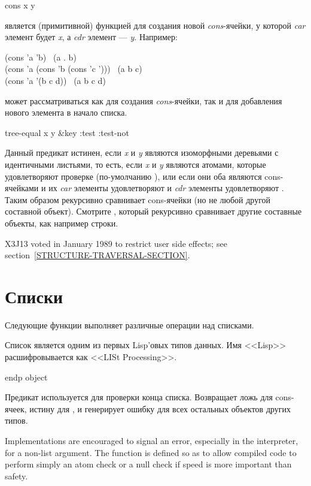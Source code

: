 \begin{defun}[Функция]
cons x y

 является (примитивной) функцией для создания новой
\emph{cons}-ячейки, у которой \emph{car} элемент будет \emph{x}, а \emph{cdr}
элемент --- \emph{y}.
Например:
\begin{lisp}
(cons 'a 'b) \EV\ (a . b) \\
(cons 'a (cons 'b (cons 'c '{\emptylist}))) \EV\ (a b c) \\
(cons 'a '(b c d)) \EV\ (a b c d)
\end{lisp}
 может рассматриваться как для создания \emph{cons}-ячейки, так и для
добавления нового элемента в начало списка.
\end{defun}

\begin{defun}[Функция]
tree-equal x y &key :test :test-not

Данный предикат истинен, если \emph{x} и \emph{y} являются изоморфными деревьями
с идентичными листьями, то есть, если \emph{x} и \emph{y} являются атомами,
которые удовлетворяют проверке (по-умолчанию ),
или если они оба являются cons-ячейками и их \emph{car} элементы удовлетворяют
 и \emph{cdr} элементы удовлетворяют .
Таким образом  рекурсивно сравнивает cons-ячейки (но не любой
другой составной объект). Смотрите , который рекурсивно сравнивает
другие составные объекты, как например строки.

\begin{new}
X3J13 voted in January 1989
to restrict user side effects; see section~\ref{STRUCTURE-TRAVERSAL-SECTION}.
\end{new}
\end{defun}

\section{Списки}

Следующие функции выполняет различные операции над списками.

Список является одним из первых Lisp'овых типов данных. Имя <<Lisp>>
расшифровывается
как <<LISt Processing>>.

\begin{defun}[Функция]
endp object

Предикат  используется для проверки конца списка. Возвращает ложь для
cons-ячеек, истину для {\nil}, и генерирует ошибку для всех остальных объектов
других типов.

\beforenoterule
\begin{implementation}
Implementations are encouraged to signal an
error, especially in the interpreter, for a non-list argument.
The  function is defined so as to allow compiled code
to perform simply an atom check or a null check if speed is more
important than safety.
\end{implementation}
\afternoterule
\end{defun}

